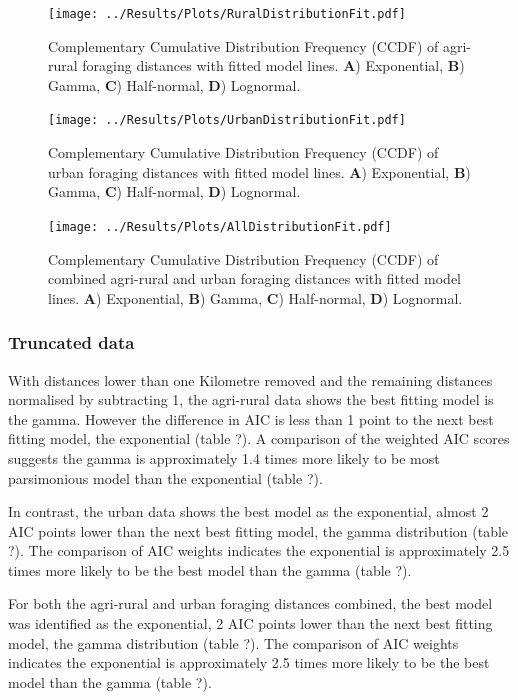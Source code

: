 \documentclass[11pt,usenames,dvipsnames]{article}
\begin{document}
\begin{figure}[H]
	\centering
	\texttt{[image: ../Results/Plots/RuralDistributionFit.pdf]}
	\caption{Complementary Cumulative Distribution Frequency (CCDF) of agri-rural foraging distances with fitted model lines. \textbf{A}) Exponential, \textbf{B}) Gamma, \textbf{C}) Half-normal, \textbf{D}) Lognormal.}
\end{figure}

\begin{figure}[H]
	\centering
	\texttt{[image: ../Results/Plots/UrbanDistributionFit.pdf]}
	\caption{Complementary Cumulative Distribution Frequency (CCDF) of urban foraging distances with fitted model lines. \textbf{A}) Exponential, \textbf{B}) Gamma, \textbf{C}) Half-normal, \textbf{D}) Lognormal.}
\end{figure}

\begin{figure}[H]
	\centering
	\texttt{[image: ../Results/Plots/AllDistributionFit.pdf]}
	\caption{Complementary Cumulative Distribution Frequency (CCDF) of combined agri-rural and urban foraging distances with fitted model lines. \textbf{A}) Exponential, \textbf{B}) Gamma, \textbf{C}) Half-normal, \textbf{D}) Lognormal.}
\end{figure}

\subsubsection{Truncated data}

\begin{linenumbers}
\hspace{\parindent}
With distances lower than one Kilometre removed and the remaining distances normalised by subtracting 1, the agri-rural data shows the best fitting model is the gamma. However the difference in AIC is less than 1 point to the next best fitting model, the exponential (table ?). A comparison of the weighted AIC scores suggests the gamma is approximately 1.4 times more likely to be most parsimonious model than the exponential (table ?).

In contrast, the urban data shows the best model as the exponential, almost 2 AIC points lower than the next best fitting model, the gamma distribution (table ?). The comparison of AIC weights indicates the exponential is approximately 2.5 times more likely to be the best model than the gamma (table ?).

For both the agri-rural and urban foraging distances combined, the best model was identified as the exponential, 2 AIC points lower than the next best fitting model, the gamma distribution (table ?). The comparison of AIC weights indicates the exponential is approximately 2.5 times more likely to be the best model than the gamma (table ?). 
\end{linenumbers}
\end{document}
